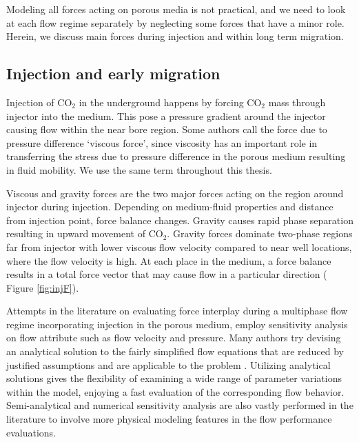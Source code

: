 Modeling all forces acting on porous media is not practical, and we need to look
at each flow regime separately by neglecting some forces that have a minor role.
Herein, we discuss main forces during injection and within long term migration.


\subsection{Injection and early migration}

Injection of $\mbox{CO}_2$ in the underground happens by forcing $\mbox{CO}_2$
mass through injector into the medium. This pose a pressure gradient around the
injector causing flow within the near bore region. Some authors call the force
due to pressure difference `viscous force', since viscosity has an important
role in transferring the stress due to pressure difference in the porous medium
resulting in fluid mobility. We use the same term throughout this thesis. 

Viscous and gravity forces are the two major forces acting on the region around
injector during injection. Depending on medium-fluid properties and distance
from injection point, force balance changes. Gravity causes rapid phase
separation resulting in upward movement of $\mbox{CO}_2$. Gravity forces
dominate two-phase regions far from injector with lower viscous flow velocity
compared to near well locations, where the flow velocity is high. At each place
in the medium, a force balance results in a total force vector that may cause
flow in a particular direction ( Figure \ref{fig:injF}).

Attempts in the literature on evaluating force interplay during a multiphase
flow regime incorporating injection in the porous medium, employ sensitivity
analysis on flow attribute such as flow velocity and pressure. Many authors try
devising an analytical solution to the fairly simplified flow equations that are
reduced by justified assumptions and are applicable to the problem
\cite{fayers1959effect,dong1999effect,nordbotten2005injection,
yortsos1983analytical,rapoport1953properties,farajzadeh2011analytical,
yang1992analytical,chen1990integral,bentsen1993effect}. Utilizing analytical
solutions gives the flexibility of examining a wide range of parameter
variations within the model, enjoying a fast evaluation of the
corresponding flow behavior. Semi-analytical and numerical sensitivity analysis
are also vastly performed in the literature to involve more physical modeling
features in the flow performance
evaluations\cite{rosado2007analysis,allen1986theoretical,alkan2010impact}.


